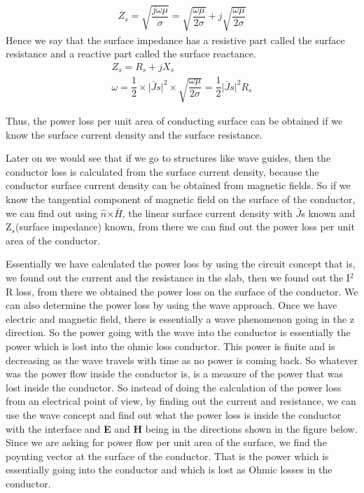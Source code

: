\begin{align}
Z_{s}=\sqrt{\dfrac{j\omega\mu}{\sigma}}=\sqrt{\dfrac{\omega\mu}{2\sigma}}+j\sqrt{\dfrac{\omega\mu}{2\sigma}}
\end{align}
Hence we say that the surface impedance has a resistive part called the surface resistance and a reactive part called the surface reactance.
\begin{align}
Z_{s}=R_{s}+jX_{s}\\	
\omega=\dfrac{1}{2}\times \lvert\bar{J}s\rvert^{2}\times \sqrt{\dfrac{\omega\mu}{2\sigma}}=\dfrac{1}{2}\lvert\bar{J}s\rvert^{2}R_{s}
\end{align}

Thus, the power loss per unit area of conducting surface can be obtained if we know the surface current density and the surface resistance.

Later on we would see that if we go to structures like wave guides, then the conductor loss is calculated from the surface current density, because the conductor surface current density can be obtained from magnetic fields. So if we know the tangential component of magnetic field on the surface of the conductor, we can find out using $\hat{n}$$\times $$\bar{H}$, the linear surface current density with $\bar{J}$s known and Z$_{s}$(surface impedance) known, from there we can find out the power loss per unit area of the conductor.

Essentially we have calculated the power loss by using the circuit concept that is, we found out the current and the resistance in the slab, then we found out the I$^{2}$R loss, from there we obtained the power loss on the surface of the conductor. We can also determine the power loss by using the wave approach. Once we have electric and magnetic field, there is essentially a wave phenomenon going in the z direction. So the power going with the wave into the conductor is essentially the power which is lost into the ohmic loss conductor. This power is finite and is decreasing as the wave travels with time as no power is coming back. So whatever was the power flow inside the conductor is, is a measure of the power that was lost inside the conductor. So instead of doing the calculation of the power loss from an electrical point of view, by finding out the current and resistance, we can use the wave concept and find out what the power loss is inside the conductor with the interface and \textbf{E} and \textbf{H} being in the directions shown in the figure below. Since we are asking for power flow per unit area of the surface, we find the poynting vector at the surface of the conductor. That is the power which is essentially going into the conductor and which is lost as Ohmic losses in the conductor.

